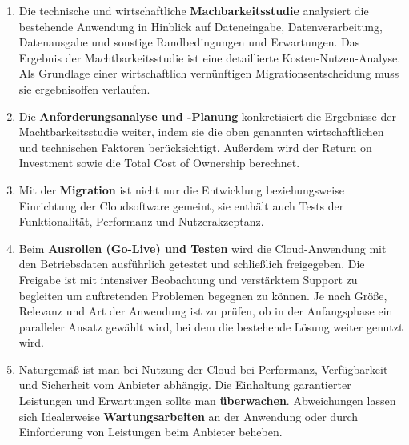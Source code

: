 \begin{enumerate}
	\item Die technische und wirtschaftliche \textbf{Machbarkeitsstudie}
analysiert die bestehende Anwendung in Hinblick auf Dateneingabe, 
Datenverarbeitung, Datenausgabe und sonstige Randbedingungen und Erwartungen. 
Das Ergebnis der Machtbarkeitsstudie ist eine detaillierte  
Kosten-Nutzen-Analyse. Als Grundlage einer wirtschaftlich vernünftigen 
Migrationsentscheidung muss sie ergebnisoffen verlaufen.
	\item Die \textbf{Anforderungsanalyse und -Planung} konkretisiert die 
Ergebnisse der Machtbarkeitsstudie weiter, indem sie die oben genannten 
wirtschaftlichen und technischen Faktoren berücksichtigt. Außerdem wird der 
Return on Investment sowie die Total Cost of Ownership berechnet.
	\item Mit der \textbf{Migration} ist nicht nur die Entwicklung 
beziehungsweise Einrichtung der Cloudsoftware gemeint, sie enthält auch Tests 
der Funktionalität, Performanz und Nutzerakzeptanz.
	\item Beim \textbf{Ausrollen (Go-Live) und Testen} wird die 
Cloud-Anwendung mit den Betriebsdaten ausführlich getestet und 
schließlich freigegeben. Die Freigabe ist mit intensiver Beobachtung und 
verstärktem Support zu begleiten um auftretenden Problemen begegnen zu können. 
Je nach Größe, Relevanz und Art der Anwendung ist zu prüfen, ob in der 
Anfangsphase  ein paralleler Ansatz gewählt wird, bei dem die bestehende Lösung 
weiter genutzt wird.
	\item Naturgemäß ist man bei Nutzung der Cloud bei Performanz, 
Verfügbarkeit und Sicherheit vom Anbieter abhängig. Die Einhaltung garantierter 
Leistungen und Erwartungen sollte man \textbf{überwachen}. Abweichungen lassen 
sich Idealerweise  \textbf{Wartungsarbeiten} an der Anwendung oder durch 
Einforderung von Leistungen beim Anbieter beheben.
\end{enumerate}
